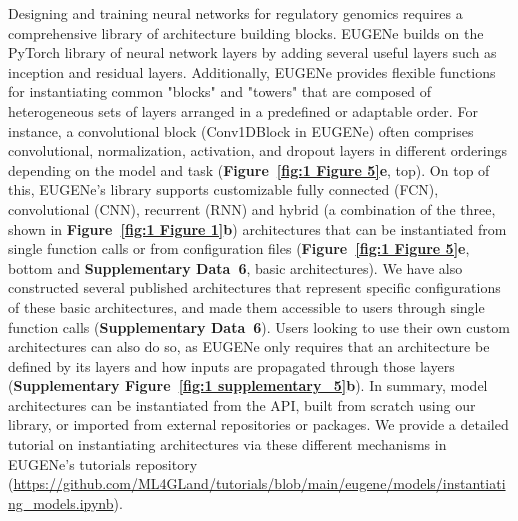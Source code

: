 Designing and training neural networks for regulatory genomics requires a comprehensive library of architecture building blocks. EUGENe builds on the PyTorch library of neural network layers by adding several useful layers such as inception and residual layers. Additionally, EUGENe provides flexible functions for instantiating common "blocks" and "towers" that are composed of heterogeneous sets of layers arranged in a predefined or adaptable order. For instance, a convolutional block (Conv1DBlock in EUGENe) often comprises convolutional, normalization, activation, and dropout layers in different orderings depending on the model and task (\textbf{Figure~\ref{fig:1 Figure 5}\textbf{e}}, top). On top of this, EUGENe’s library supports customizable fully connected (FCN), convolutional (CNN), recurrent (RNN) and hybrid (a combination of the three, shown in \textbf{Figure~\ref{fig:1 Figure 1}\textbf{b}}) architectures that can be instantiated from single function calls or from configuration files (\textbf{Figure~\ref{fig:1 Figure 5}\textbf{e}}, bottom and \textbf{\textbf{Supplementary Data~6}}, basic architectures). We have also constructed several published architectures that represent specific configurations of these basic architectures, and made them accessible to users through single function calls (\textbf{\textbf{Supplementary Data~6}}). Users looking to use their own custom architectures can also do so, as EUGENe only requires that an architecture be defined by its layers and how inputs are propagated through those layers (\textbf{Supplementary Figure~\ref{fig:1 supplementary_5}\textbf{b}}). In summary, model architectures can be instantiated from the API, built from scratch using our library, or imported from external repositories or packages. We provide a detailed tutorial on instantiating architectures via these different mechanisms in EUGENe’s tutorials repository (\url{https://github.com/ML4GLand/tutorials/blob/main/eugene/models/instantiating_models.ipynb}).

